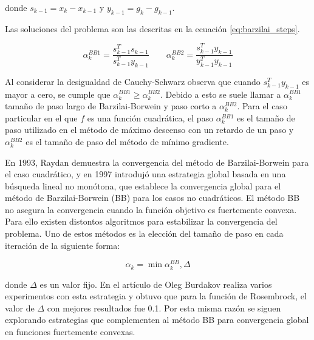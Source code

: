 donde $s_{k-1} = x_k - x_{k-1}$ y $y_{k-1} = g_k - g_{k-1}$.

Las soluciones del problema son las descritas en la ecuación \ref{eq:barzilai_steps}.

\begin{equation}
    \alpha^{BB1}_k = \frac{s^T_{k-1}s_{k-1}}{s^T_{k-1}y_{k-1}} \qquad \alpha_k^{BB2} = \frac{s_{k-1}^Ty_{k-1}}{y_{k-1}^Ty_{k-1}} \label{eq:barzilai_steps}
\end{equation}

Al considerar la desigualdad de Cauchy-Schwarz observa que cuando $s_{k-1}^Ty_{k-1}$ es mayor a cero, se cumple que $\alpha_k^{BB1} \geq \alpha_k^{BB2}$. Debido a esto se suele llamar a $\alpha_k^{BB1}$ tamaño de paso largo de Barzilai-Borwein y paso corto a $\alpha_k^{BB2}$. Para el caso particular en el que $f$ es una función cuadrática, el paso $\alpha_k^{BB1}$ es el tamaño de paso utilizado en el método de máximo descenso con un retardo de un paso y $\alpha_k^{BB2}$ es el tamaño de paso del método de mínimo gradiente. 
\par En 1993, Raydan demuestra la convergencia del método de Barzilai-Borwein para el caso cuadrático\cite{raydan_1993}, y en 1997\cite{raydan_1997} introdujó una estrategia global basada en una búsqueda lineal no monótona, que establece la convergencia global para el método de Barzilai-Borwein (BB) para los casos no cuadráticos. El método BB no asegura la convergencia cuando la función objetivo es fuertemente convexa. Para ello existen distontos algoritmos para estabilizar la convergencia del problema. Uno de estos métodos es la elección del tamaño de paso en cada iteración de la siguiente forma:

\begin{equation}
    \alpha_k = \min \alpha_k^{BB}, \Delta
\end{equation}

donde $\Delta$ es un valor fijo. En el artículo de Oleg Burdakov\cite{burdakob_2019} realiza varios experimentos con esta estrategia y obtuvo que para la función de Rosembrock, el valor de $\Delta$ con mejores resultados fue 0.1. Por esta misma razón se siguen explorando estrategias que complementen al método BB para convergencia global en funciones fuertemente convexas.
